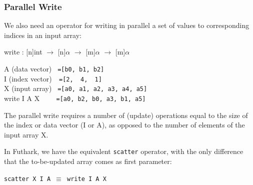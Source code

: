 \documentclass{beamer}
\renewcommand{\emph}[1]{\textcolor{structure}{#1}}
\newcommand{\emp}[1]{\textcolor{DikuRed}{ #1}}
\begin{document}
\begin{frame}[fragile,t]
  \frametitle{Parallel Write}

We also need an operator for \emph{writing in parallel} a set of values to corresponding indices in an input array:
\smallskip

\emph{write : [n]int $\rightarrow$ [n]$\alpha$ $\rightarrow$ [m]$\alpha$ $\rightarrow$ [m]$\alpha$}
\bigskip

A (data vector) {\tt~=[b0, b1, b2]}\\
I (index vector){\tt~~=[2,~~4,~~1]}\\
X (input array) {\tt~=[a0,~a1,~a2,~a3,~a4,~a5]}\\
\emp{write I A X     {\tt~~~~=[a0,~b2,~b0,~a3,~b1,~a5]}}
\bigskip

The \emph{parallel write} requires a number of (update) operations equal to the size of the index or data vector (I or A), as opposed to the number of elements of the input array X. 
\bigskip 

In Futhark, we have the equivalent {\tt scatter} operator, with the only difference
that the to-be-updated array comes as first parameter:
\smallskip

\emph{\tt scatter X I A $\equiv$ write I A X}

\end{frame}
\end{document}
